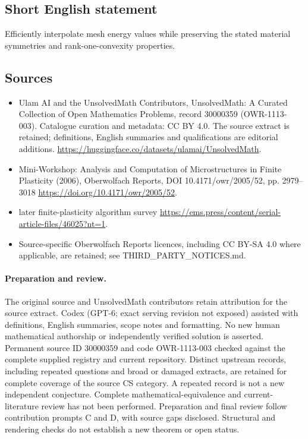 \documentclass[11pt]{article}
\begin{document}
\subsection{Short English statement}
Efficiently interpolate mesh energy values while preserving the stated material symmetries and rank-one-convexity properties.
\subsection{Sources}
\begin{itemize}
\item[\hypertarget{source:30000359:1}{S1}] Ulam AI and the UnsolvedMath Contributors, UnsolvedMath: A Curated Collection of Open Mathematics Problems, record 30000359 (OWR-1113-003). Catalogue curation and metadata: CC BY 4.0. The source extract is retained; definitions, English summaries and qualifications are editorial additions.
\url{https://huggingface.co/datasets/ulamai/UnsolvedMath}.
\item[\hypertarget{source:30000359:2}{S2}] Mini-Workshop: Analysis and Computation of Microstructures in Finite Plasticity (2006), Oberwolfach Reports, DOI 10.4171/owr/2005/52, pp. 2979--3018
\url{https://doi.org/10.4171/owr/2005/52}.
\item[\hypertarget{source:30000359:3}{S3}] later finite-plasticity algorithm survey
\url{https://ems.press/content/serial-article-files/46025?nt=1}.
\item Source-specific Oberwolfach Reports licences, including CC BY-SA 4.0 where applicable, are retained; see THIRD\_PARTY\_NOTICES.md.
\end{itemize}
\paragraph{Preparation and review.}
The original source and UnsolvedMath contributors retain attribution for the source extract. Codex (GPT-6; exact serving revision not exposed) assisted with definitions, English summaries, scope notes and formatting. No new human mathematical authorship or independently verified solution is asserted. Permanent source ID 30000359 and code OWR-1113-003 checked against the complete supplied registry and current repository. Distinct upstream records, including repeated questions and broad or damaged extracts, are retained for complete coverage of the source CS category. A repeated record is not a new independent conjecture. Complete mathematical-equivalence and current-literature review has not been performed. Preparation and final review follow contribution prompts C and D, with source gaps disclosed. Structural and rendering checks do not establish a new theorem or open status.
\label{end:30000359}
\end{document}
